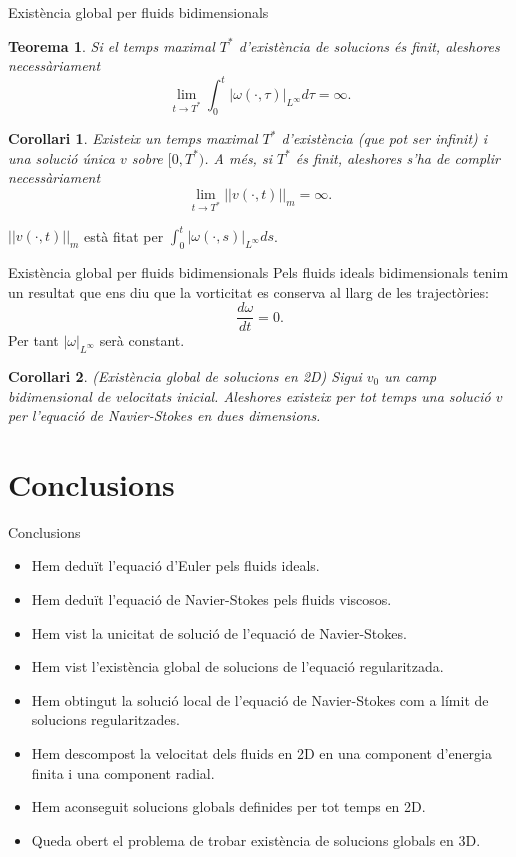 \documentclass{beamer}
\newtheorem{teorema}{Teorema}
\newtheorem{corollari}{Corol\textperiodcentered lari}
\begin{document}
\begin{frame}{Exist\`{e}ncia global per fluids bidimensionals}
\begin{teorema}
Si el temps maximal $T^*$ d'exist\`{e}ncia de solucions \'{e}s finit, aleshores necess\`{a}riament
\[\lim_{t\to T^*}\int_0^t|\omega(\cdot,\tau)|_{L^{\infty}}d\tau=\infty.\]
\end{teorema}
\pause
\begin{corollari}
Existeix un temps maximal $T^*$ d'exist\`{e}ncia (que pot ser infinit) i una soluci\'{o} \'{u}nica $v$ sobre $[0,T^*)$. A m\'{e}s, si $T^*$ \'{e}s finit, aleshores s'ha de complir necess\`{a}riament
\[\lim_{t\to T^*}||v(\cdot,t)||_m=\infty.\]
\end{corollari}
\pause
$||v(\cdot,t)||_m$ est\`{a} fitat per $\int_0^t|\omega(\cdot,s)|_{L^{\infty}}ds$.
\end{frame}

\begin{frame}{Exist\`{e}ncia global per fluids bidimensionals}
Pels fluids ideals bidimensionals tenim un resultat que ens diu que la vorticitat es conserva al llarg de les traject\`{o}ries:
\[\frac{d\omega}{dt}=0.\]
Per tant $|\omega|_{L^{\infty}}$ ser\`{a} constant.
\pause
\begin{corollari}
(Exist\`{e}ncia global de solucions en 2D) Sigui $v_0$ un camp bidimensional de velocitats inicial. Aleshores existeix per tot temps una soluci\'{o} $v$ per l'equaci\'{o} de Navier-Stokes en dues dimensions.
\end{corollari}
\end{frame}

\section{Conclusions}

\begin{frame}{Conclusions}
\begin{itemize}
\item Hem dedu\"{i}t l'equaci\'{o} d'Euler pels fluids ideals.
\pause
\item Hem dedu\"{i}t l'equaci\'{o} de Navier-Stokes pels fluids viscosos.
\pause
\item Hem vist la unicitat de soluci\'{o} de l'equaci\'{o} de Navier-Stokes.
\pause
\item Hem vist l'exist\`{e}ncia global de solucions de l'equaci\'{o} regularitzada.
\pause
\item Hem obtingut la soluci\'{o} local de l'equaci\'{o} de Navier-Stokes com a l\'{i}mit de solucions regularitzades.
\pause
\item Hem descompost la velocitat dels fluids en 2D en una component d'energia finita i una component radial.
\pause
\item Hem aconseguit solucions globals definides per tot temps en 2D.
\pause
\item Queda obert el problema de trobar exist\`{e}ncia de solucions globals en 3D.
\end{itemize}
\end{frame}
\end{document}

